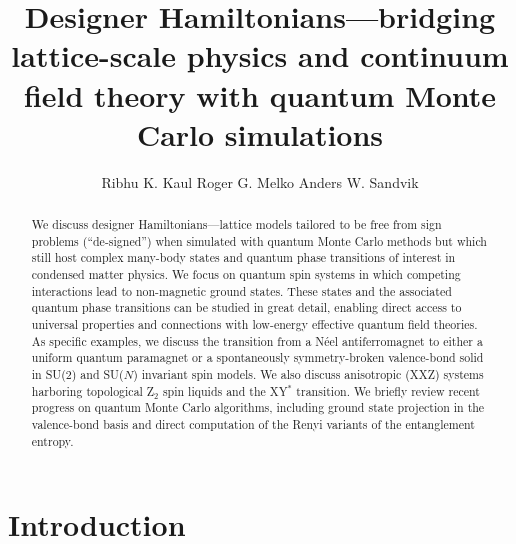 \documentclass[range]{ar2e}
\begin{document}




\title{Designer Hamiltonians---bridging lattice-scale physics and continuum field theory with 
quantum Monte Carlo simulations} 

\author{Ribhu K. Kaul
Roger G. Melko
Anders W. Sandvik
}

\begin{abstract}
We discuss designer Hamiltonians---lattice models tailored to be free from sign problems (``de-signed'') when simulated with quantum 
Monte Carlo methods but which still host complex  many-body states and quantum phase transitions of interest in condensed matter 
physics. We focus on quantum spin systems in which competing interactions lead to non-magnetic ground states. These states and the 
associated quantum phase transitions can be studied in great detail, enabling direct access to universal properties and connections 
with low-energy effective quantum field theories. As specific examples, we discuss the transition from a N\'eel antiferromagnet to 
either a uniform quantum paramagnet or a spontaneously symmetry-broken valence-bond solid in SU($2$) and SU($N$) invariant spin models. 
We also discuss anisotropic (XXZ) systems harboring topological Z$_2$ spin liquids and the XY$^*$ transition. We briefly review recent 
progress on quantum Monte Carlo algorithms, including ground state projection in the valence-bond basis and direct computation 
of the Renyi variants of the entanglement entropy.
\end{abstract}

\maketitle

\section{Introduction}
\label{sec:intro}
\end{document}
